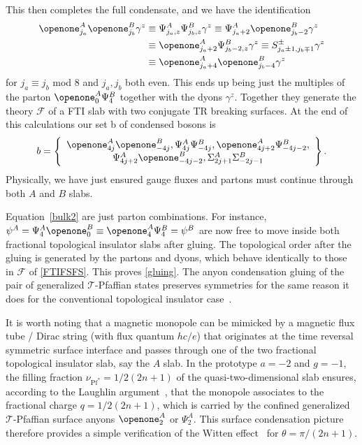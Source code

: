 This then completes the full condensate, and we have the identification
\begin{align}
\openone^A_{j_a}\openone^B_{j_b}\gamma^z&\equiv\Psi^A_{j_a,z}\Psi^B_{j_b,z}\gamma^z\equiv\Psi^A_{j_a+2}\openone^B_{j_b-2}\gamma^z\nonumber\\&\equiv\openone^A_{j_a+2}\Psi^B_{j_b-2,z}\gamma^z\equiv S^\pm_{j_a\pm1,j_b\mp1}\gamma^z\nonumber\\&\equiv\openone^A_{j_a+4}\openone^B_{j_b-4}\gamma^z\label{bulk2}
\end{align}
for $j_a\equiv j_b$ mod 8 and $j_a,j_b$ both even. This ends up being just the multiples of the parton $\openone^A_{0}\Psi^B_{4}$ together with the dyons $\gamma^z$. Together they generate the theory $\mathcal{F}$ of a FTI slab with two conjugate TR breaking surfaces. At the end of this calculations our set b of condensed bosons is 
\begin{align}b=\left\{\begin{array}{*{20}c}\openone^A_{4j}\openone^B_{-4j},\Psi^A_{4j}\Psi^B_{-4j},\openone^A_{4j+2}\Psi^B_{-4j-2},\\\Psi^A_{4j+2}\openone^B_{-4j-2},\Sigma^A_{2j+1}\Sigma^B_{-2j-1}\end{array}\right\}.\label{bosons}\end{align} Physically, we have just ensured gauge fluxes and partons must continue through both $A$ and $B$ slabs.

Equation~\eqref{bulk2} are just parton combinations. For instance, $\psi^A=\Psi^A_4\openone^B_0\equiv\openone^A_4\Psi^B_4=\psi^B$ are now free to move inside both fractional topological insulator slabs after gluing. The topological order after the gluing is generated by the partons and dyons, which behave identically to those in $\mathcal{F}$ of \eqref{FTIFSFS}. This proves \eqref{gluing}. The anyon condensation gluing of the pair of generalized $\mathcal{T}$-Pfaffian states preserves symmetries for the same reason it does for the conventional topological insulator case~\cite{ChenFidkowskiVishwanath14,ChoTeoFradkin17}.

It is worth noting that a magnetic monopole can be mimicked by a magnetic flux tube / Dirac string (with flux quantum $hc/e$) that originates at the time reversal symmetric surface interface and passes through one of the two fractional topological insulator slab, say the $A$ slab. In the prototype $a=-2$ and $g=-1$, the filling fraction $\nu_{\mathrm{Pf}^\ast}=1/2(2n+1)$ of the quasi-two-dimensional slab ensures, according to the Laughlin argument~\cite{Laughlin_IQHE}, that the monopole associates to the fractional charge $q=1/2(2n+1)$, which is carried by the confined generalized $\mathcal{T}$-Pfaffian surface anyons $\openone^A_2$ or $\Psi^A_2$. This surface condensation picture therefore provides a simple verification of the Witten effect~\cite{Witten79} for $\theta=\pi/(2n+1)$. 


